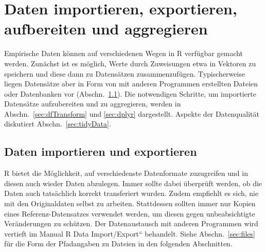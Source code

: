 \chapter{Daten importieren, exportieren, aufbereiten und aggregieren}
\label{sec:dfChap}

Empirische Daten können auf verschiedenen Wegen in R verfügbar gemacht werden. Zunächst ist es möglich, Werte durch Zuweisungen etwa in Vektoren zu speichern und diese dann zu Datensätzen zusammenzufügen. Typischerweise liegen Datensätze aber in Form von mit anderen Programmen erstellten Dateien oder Datenbanken vor (Abschn.\ \ref{sec:dataImport}). Die notwendigen Schritte, um importierte Datensätze aufzubereiten und zu aggregieren, werden in Abschn.\ \ref{sec:dfTransform} und \ref{sec:dplyr} dargestellt. Aspekte der Datenqualität diskutiert Abschn.\ \ref{sec:tidyData}.

\section{Daten importieren und exportieren}
\label{sec:dataImport}

R bietet die Möglichkeit, auf verschiedenste Datenformate zuzugreifen und in diesen auch wieder Daten abzulegen. Immer sollte dabei überprüft werden, ob die Daten auch tatsächlich korrekt transferiert wurden. Zudem empfiehlt es sich, nie mit den Originaldaten selbst zu arbeiten. Stattdessen sollten immer nur Kopien eines Referenz-Datensatzes verwendet werden, um diesen gegen unbeabsichtigte Veränderungen zu schützen. Der Datenaustausch mit anderen Programmen wird vertieft im Manual {\quotedblbase}R Data Import/Export{\textquotedblleft} \cite{RDevelopmentCoreTeam2008b} behandelt. Siehe Abschn.\ \ref{sec:files} für die Form der Pfadangaben zu Dateien in den folgenden Abschnitten.


